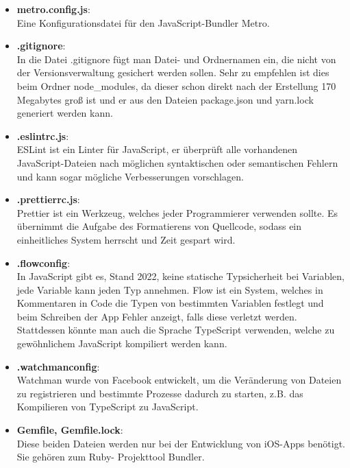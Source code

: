\begin{itemize}
\item \textbf{metro.config.js}:\\
Eine Konfigurationsdatei für den JavaScript-Bundler Metro.

\item \textbf{.gitignore}:\\
In die Datei .gitignore fügt man Datei- und Ordnernamen ein, die nicht von der Versionsverwaltung
gesichert werden sollen. Sehr zu empfehlen ist dies beim Ordner node\_modules, da dieser schon
direkt nach der Erstellung 170 Megabytes groß ist und er aus den Dateien package.json und yarn.lock
generiert werden kann.

\item \textbf{.eslintrc.js}:\\
ESLint ist ein Linter für JavaScript, er überprüft alle vorhandenen JavaScript-Dateien nach
möglichen syntaktischen oder semantischen Fehlern und kann sogar mögliche Verbesserungen vorschlagen.

\item \textbf{.prettierrc.js}:\\
Prettier ist ein Werkzeug, welches jeder Programmierer verwenden sollte. Es übernimmt die Aufgabe
des Formatierens von Quellcode, sodass ein einheitliches System herrscht und Zeit gespart wird.

\item \textbf{.flowconfig}:\\
In JavaScript gibt es, Stand 2022, keine statische Typsicherheit bei Variablen, jede Variable kann
jeden Typ annehmen. Flow ist ein System, welches in Kommentaren in Code die Typen von bestimmten
Variablen festlegt und beim Schreiben der App Fehler anzeigt, falls diese verletzt werden.
Stattdessen könnte man auch die Sprache TypeScript verwenden, welche zu gewöhnlichem JavaScript
kompiliert werden kann.

\item \textbf{.watchmanconfig}:\\
Watchman wurde von Facebook entwickelt, um die Veränderung von Dateien zu registrieren und bestimmte
Prozesse dadurch zu starten, z.B. das Kompilieren von TypeScript zu JavaScript.

\item \textbf{Gemfile, Gemfile.lock}:\\
Diese beiden Dateien werden nur bei der Entwicklung von iOS-Apps benötigt. Sie gehören zum Ruby-
Projekttool Bundler.

\end{itemize}

